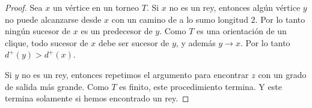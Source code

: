 \begin{proof}
    Sea $x$ un vértice en un torneo $T$. Si $x$ no es un rey, entonces algún vértice $y$ no puede alcanzarse desde $x$ con un camino de a lo sumo longitud $2$. Por lo tanto ningún sucesor de $x$ es un predecesor de $y$. Como $T$ es una orientación de un clique, todo sucesor de $x$ debe ser sucesor de $y$, y además $y \rightarrow x$. Por lo tanto $d^+(y) > d^+(x)$.
    
    Si $y$ no es un rey, entonces repetimos el argumento para encontrar $z$ con un grado de salida más grande. Como $T$ es finito, este procedimiento termina. Y este termina solamente si hemos encontrado un rey.
\end{proof}